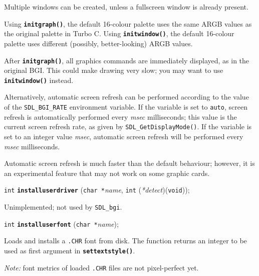 \documentclass[a4paper,12pt]{article}
\newcommand{\SDLbgi}{\texttt{SDL\_bgi}}
\newcommand{\V}{\texttt{void}}      %
\newcommand{\I}{\texttt{int}}       %
\newcommand{\C}{\texttt{char *}}    %
\newcommand{\func}[1]{\textbf{\texttt{#1}}}  %
\newcommand{\A}[1]{\emph{#1}}       %
\newcommand{\T}[1]{\texttt{#1}}     %
\newcommand{\file}[1]{\texttt{#1}}
\newenvironment{bgi}
{ %
  \begin{snugshade}
}
{ %
  \end{snugshade}
}
\begin{document}
Multiple windows can be created, unless a fullscreen window is already
present.

Using \func{initgraph()}, the default 16-colour palette uses the same
ARGB values as the original palette in Turbo C. Using
\func{initwindow()}, the default 16-colour palette uses different
(possibly, better-looking) ARGB values.

After \func{initgraph()}, all graphics commands are immediately
displayed, as in the original BGI. This could make drawing very slow;
you may want to use \func{initwindow()} instead.

Alternatively, automatic screen refresh can be performed according to
the value of the \T{SDL\_BGI\_RATE} environment variable. If the
variable is set to \T{auto}, screen refresh is automatically performed
every \A{msec} milliseconds; this value is the current screen refresh
rate, as given by \T{SDL\_GetDisplayMode()}. If the variable is set to
an integer value \A{msec}, automatic screen refresh will be performed
every \A{msec} milliseconds.

Automatic screen refresh is much faster than the default behaviour;
however, it is an experimental feature that may not work on some
graphic cards.


\label{sec:installuserdriver}

\begin{bgi}
\I{} \func{installuserdriver} (\C{}\A{name}, \I{} (\A{*detect})(\V{}));
\end{bgi}

Unimplemented; not used by \SDLbgi.


\label{sec:installuserfont}

\begin{bgi}
\I{} \func{installuserfont} (\C{}\A{name});
\end{bgi}

Loads and installs a \file{.CHR} font from disk. The function returns
an integer to be used as first argument in \func{settextstyle()}.

\emph{Note:} font metrics of loaded \file{.CHR} files are not
pixel-perfect yet.


\label{sec:line}
\end{document}
